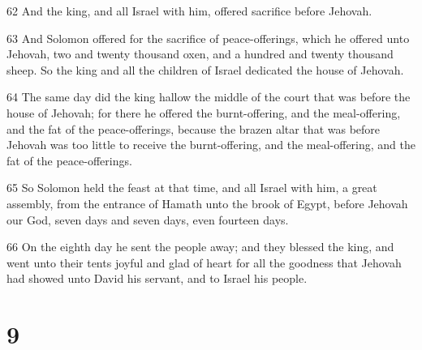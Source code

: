 \par 62 And the king, and all Israel with him, offered sacrifice before Jehovah.
\par 63 And Solomon offered for the sacrifice of peace-offerings, which he offered unto Jehovah, two and twenty thousand oxen, and a hundred and twenty thousand sheep. So the king and all the children of Israel dedicated the house of Jehovah.
\par 64 The same day did the king hallow the middle of the court that was before the house of Jehovah; for there he offered the burnt-offering, and the meal-offering, and the fat of the peace-offerings, because the brazen altar that was before Jehovah was too little to receive the burnt-offering, and the meal-offering, and the fat of the peace-offerings.
\par 65 So Solomon held the feast at that time, and all Israel with him, a great assembly, from the entrance of Hamath unto the brook of Egypt, before Jehovah our God, seven days and seven days, even fourteen days.
\par 66 On the eighth day he sent the people away; and they blessed the king, and went unto their tents joyful and glad of heart for all the goodness that Jehovah had showed unto David his servant, and to Israel his people.

\chapter{9}

